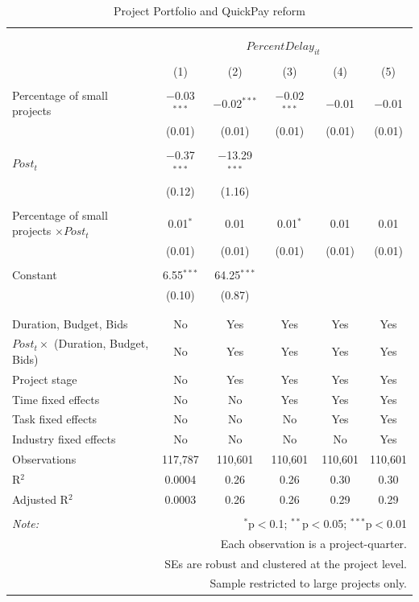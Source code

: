\documentclass[
]{article}
\begin{document}
\begin{table}[H] \centering 
  \caption{Project Portfolio and QuickPay reform} 
  \label{} 
\small 
\begin{tabular}{@{\extracolsep{-10pt}}lccccc} 
\\[-1.8ex]\hline 
\hline \\[-1.8ex] 
\\[-1.8ex] & \multicolumn{5}{c}{$PercentDelay_{it}$} \\ 
\\[-1.8ex] & (1) & (2) & (3) & (4) & (5)\\ 
\hline \\[-1.8ex] 
 Percentage of small projects & $-$0.03$^{***}$ & $-$0.02$^{***}$ & $-$0.02$^{***}$ & $-$0.01 & $-$0.01 \\ 
  & (0.01) & (0.01) & (0.01) & (0.01) & (0.01) \\ 
  & & & & & \\ 
 $Post_t$ & $-$0.37$^{***}$ & $-$13.29$^{***}$ &  &  &  \\ 
  & (0.12) & (1.16) &  &  &  \\ 
  & & & & & \\ 
 Percentage of small projects $\times Post_t$ & 0.01$^{*}$ & 0.01 & 0.01$^{*}$ & 0.01 & 0.01 \\ 
  & (0.01) & (0.01) & (0.01) & (0.01) & (0.01) \\ 
  & & & & & \\ 
 Constant & 6.55$^{***}$ & 64.25$^{***}$ &  &  &  \\ 
  & (0.10) & (0.87) &  &  &  \\ 
  & & & & & \\ 
\hline \\[-1.8ex] 
Duration, Budget, Bids & No & Yes & Yes & Yes & Yes \\ 
$Post_t \times $  (Duration, Budget, Bids) & No & Yes & Yes & Yes & Yes \\ 
Project stage & No & Yes & Yes & Yes & Yes \\ 
Time fixed effects & No & No & Yes & Yes & Yes \\ 
Task fixed effects & No & No & No & Yes & Yes \\ 
Industry fixed effects & No & No & No & No & Yes \\ 
Observations & 117,787 & 110,601 & 110,601 & 110,601 & 110,601 \\ 
R$^{2}$ & 0.0004 & 0.26 & 0.26 & 0.30 & 0.30 \\ 
Adjusted R$^{2}$ & 0.0003 & 0.26 & 0.26 & 0.29 & 0.29 \\ 
\hline 
\hline \\[-1.8ex] 
\textit{Note:}  & \multicolumn{5}{r}{$^{*}$p$<$0.1; $^{**}$p$<$0.05; $^{***}$p$<$0.01} \\ 
 & \multicolumn{5}{r}{Each observation is a project-quarter.} \\ 
 & \multicolumn{5}{r}{SEs are robust and clustered at the project level.} \\ 
 & \multicolumn{5}{r}{Sample restricted to large projects only.} \\ 
\end{tabular} 
\end{table}
\end{document}
